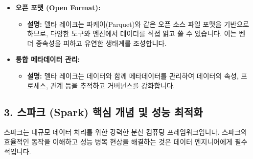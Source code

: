 \documentclass[11pt,a4paper]{article}
\theoremstyle{definition}
\begin{document}
\begin{tcolorbox}[title=\textbf{델타 레이크의 주요 기능}, colback=cyan!5!white, colframe=cyan!75!black, sharp corners, boxrule=0.8pt]
\begin{itemize}
\begin{itemize}
        \item \textbf{왜 필요한가?:} 대규모 데이터에서 쿼리 성능을 최적화하려면 불필요한 데이터 읽기를 최소화해야 합니다.
        \item \textbf{설명:} 델타 레이크는 파일 레벨의 통계(최소/최대 값 등)를 메타데이터로 저장하여 쿼리 시 관련 없는 데이터 파일을 건너뛸 수 있습니다(데이터 스키핑). Z-오더링은 여러 컬럼에 대한 쿼리 성능을 향상시키기 위해 데이터를 물리적으로 재구성하는 기술로, 데이터 지역성을 높여 I/O를 줄입니다.
    \end{itemize}
    \item \textbf{오픈 포맷 (Open Format):}
    \begin{itemize}
        \item \textbf{설명:} 델타 레이크는 파케이(Parquet)와 같은 오픈 소스 파일 포맷을 기반으로 하므로, 다양한 도구와 엔진에서 데이터를 직접 읽고 쓸 수 있습니다. 이는 벤더 종속성을 피하고 유연한 생태계를 조성합니다.
    \end{itemize}
    \item \textbf{통합 메타데이터 관리:}
    \begin{itemize}
        \item \textbf{설명:} 델타 레이크는 데이터와 함께 메타데이터를 관리하여 데이터의 속성, 프로세스, 관계 등을 추적하고 거버넌스를 강화합니다.
    \end{itemize}
\end{itemize}
\end{tcolorbox}

\subsection*{3. 스파크 (Spark) 핵심 개념 및 성능 최적화}

스파크는 대규모 데이터 처리를 위한 강력한 분산 컴퓨팅 프레임워크입니다. 스파크의 효율적인 동작을 이해하고 성능 병목 현상을 해결하는 것은 데이터 엔지니어에게 필수적입니다.
\end{document}
